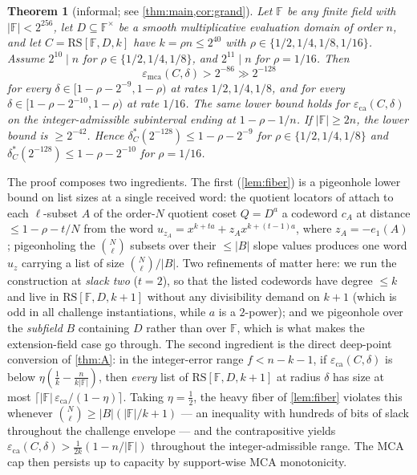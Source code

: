 \documentclass[11pt]{article}
\newtheorem{theorem}{Theorem}[section]
\theoremstyle{definition}
\theoremstyle{remark}
\newcommand{\F}{\mathbb{F}}
\newcommand{\B}{B}
\newcommand{\RS}{\mathrm{RS}}
\newcommand{\eca}{\varepsilon_{\mathrm{ca}}}
\newcommand{\emca}{\varepsilon_{\mathrm{mca}}}
\newcommand{\eone}{e_1}
\begin{document}
\begin{theorem}[informal; see \cref{thm:main,cor:grand}]\label{thm:informal}
Let $\F$ be any finite field with $|\F|<2^{256}$, let $D\subseteq\F^\times$ be a smooth multiplicative evaluation domain of order $n$, and let $C=\RS[\F,D,k]$ have $k=\rho n\le2^{40}$ with $\rho\in\{1/2,1/4,1/8,1/16\}$. Assume $2^{10}\mid n$ for $\rho\in\{1/2,1/4,1/8\}$, and $2^{11}\mid n$ for $\rho=1/16$. Then
\[
\emca(C,\delta)>2^{-86}\gg2^{-128}
\]
for every $\delta\in[1-\rho-2^{-9},1-\rho)$ at rates $1/2,1/4,1/8$, and for every $\delta\in[1-\rho-2^{-10},1-\rho)$ at rate $1/16$. The same lower bound holds for $\eca(C,\delta)$ on the integer-admissible subinterval ending at $1-\rho-1/n$. If $|\F|\ge2n$, the lower bound is $\ge2^{-42}$. Hence $\delta^*_C(2^{-128})\le1-\rho-2^{-9}$ for $\rho\in\{1/2,1/4,1/8\}$ and $\delta^*_C(2^{-128})\le1-\rho-2^{-10}$ for $\rho=1/16$.
\end{theorem}

The proof composes two ingredients. The first (\cref{lem:fiber}) is a pigeonhole lower bound on list sizes at a single received word: the quotient locators of \cite{Cho26a} attach to each $\ell$-subset $A$ of the order-$N$ quotient coset $Q=D^{a}$ a codeword $c_A$ at distance $\le1-\rho-t/N$ from the word $u_{z_A}=x^{k+ta}+z_Ax^{k+(t-1)a}$, where $z_A=-\eone(A)$; pigeonholing the $\binom N\ell$ subsets over their $\le|\B|$ slope values produces one word $u_z$ carrying a list of size $\binom N\ell/|\B|$. Two refinements of \cite[Main Thm.\,(d)]{Cho26a} matter here: we run the construction at \emph{slack two} ($t=2$), so that the listed codewords have degree $\le k$ and live in $\RS[\F,D,k+1]$ without any divisibility demand on $k+1$ (which is odd in all challenge instantiations, while $a$ is a $2$-power); and we pigeonhole over the \emph{subfield} $\B$ containing $D$ rather than over $\F$, which is what makes the extension-field case go through. The second ingredient is the direct deep-point conversion of \cref{thm:A}: in the integer-error range $f<n-k-1$, if $\eca(C,\delta)$ is below $\eta(\frac1k-\frac n{k|\F|})$, then \emph{every} list of $\RS[\F,D,k+1]$ at radius $\delta$ has size at most $\lceil|\F|\,\eca/(1-\eta)\rceil$. Taking $\eta=\frac12$, the heavy fiber of \cref{lem:fiber} violates this whenever $\binom N\ell\ge|\B|(|\F|/k+1)$ --- an inequality with hundreds of bits of slack throughout the challenge envelope --- and the contrapositive yields $\eca(C,\delta)>\frac1{2k}(1-n/|\F|)$ throughout the integer-admissible range. The MCA cap then persists up to capacity by support-wise MCA monotonicity.
\end{document}
